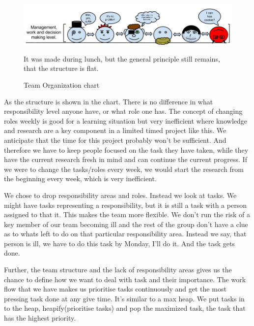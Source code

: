 \documentclass[12pt]{article}
\begin{document}
    \begin{figure}[h]
        \centering
        \includegraphics[scale=0.5]{TeamOrganizationchart}
        \caption{Team Organization chart}
        It was made during lunch, but the general principle still remains, that the structure is flat.
        \label{fig:teamOrgchart}
    \end{figure}
    
    
    As the structure is shown in the chart. There is no difference in what responsibility level anyone have, or what role one has. The concept of changing roles weekly is good for a learning situation but very inefficient where knowledge and research are a key component in a limited timed project like this. We anticipate that the time for this project probably won't be sufficient. And therefore we have to keep people focused on the task they have taken, while they have the current research fresh in mind and can continue the current progress. If we were to change the tasks/roles every week, we would start the research from the beginning every week, which is very inefficient. 

    We chose to drop responsibility areas and roles. Instead we look at tasks. We might have tasks representing a responsibility, but it is still a task with a person assigned to that it. This makes the team more flexible. We don't run the risk of a key member of our team becoming ill and the rest of the group don't have a clue as to whats left to do on that particular responsibility area. Instead we say, that person is ill, we have to do this task by Monday, I'll do it. And the task gets done. 
    
    Further, the team structure and the lack of responsibility areas gives us the chance to define how we want to deal with task and their importance. The work flow that we have makes us prioritise tasks continuously and get the most pressing task done at any give time. It's similar to a max heap. We put tasks in to the heap, heapify(prioritise tasks) and pop the maximized task, the task that has the highest priority. 
    
\end{document}
